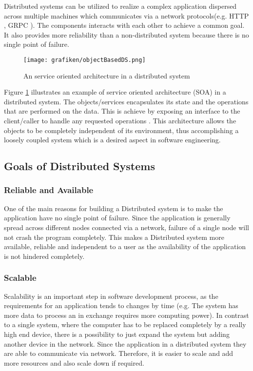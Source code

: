     \par
        Distributed systems can be utilized to realize a complex application dispersed across
        multiple machines which communicates via a network protocols(e.g. HTTP \cite{HTTP}, 
        GRPC \cite{grpc}). The 
        components interacts with each other to achieve a common goal. It also provides
        more reliability than a non-distributed system because there is no single point
        of failure. 

    \begin{figure}[H]
        \centering \texttt{[image: grafiken/objectBasedDS.png]}
        \caption{An service oriented architecture in a distributed system 
            \cite[p.~62]{DistributedSystems}}
        \label{fig:objectBasedDS}
    \end{figure}

    \par
        Figure \ref{fig:objectBasedDS} illustrates an example of service oriented architecture 
        (SOA) in a distributed system. The objects/services encapsulates its state and 
        the operations that are performed on the data. This is achieve by exposing an 
        interface to the client/caller to handle any requested operations
        \cite{DistributedSystems}. This architecture allows the objects to be
        completely independent of its environment, thus accomplishing a loosely
        coupled system which is a desired aspect in software engineering.
        
    \subsection{Goals of Distributed Systems} 
        \subsubsection{Reliable and Available}
        One of the main reasons for building a Distributed system is to make the application have no single point of failure.
        Since the application is generally spread across different nodes connected via a network, failure of a single node will not 
        crash the program completely. This makes a Distributed system more available, reliable and independent to a user as the availability
        of the application is not hindered completely.
        
        \subsubsection{Scalable}
        Scalability is an important step in software development process, as the requirements for an application tends to changes by time 
        (e.g. The system has more data to process an in exchange requires more computing power). In contrast to a single system, where the computer 
        has to be replaced completely by a really high end device, there is a possibility to just expand the system but adding another device in the network.
        Since the application in a distributed system they are able to communicate via network. Therefore, it is easier to scale and add more resources and 
        also scale down if required. 

